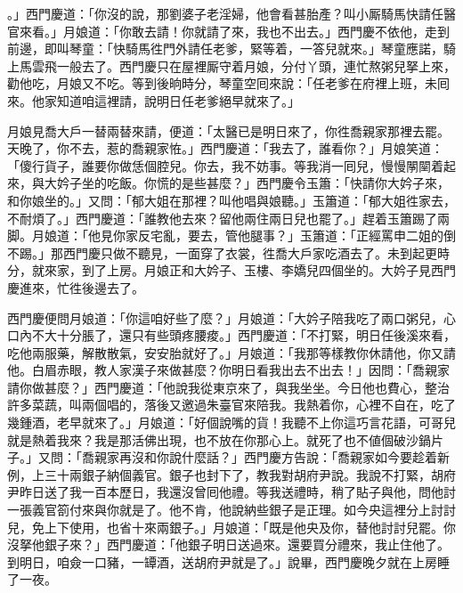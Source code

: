 。」西門慶道：「你沒的說，那劉婆子老淫婦，他會看甚胎產？叫小厮騎馬快請任醫官來看。」月娘道：「你敢去請！你就請了來，我也不出去。」西門慶不依他，走到前邊，即叫琴童：「快騎馬徃門外請任老爹，緊等着，一答兒就來。」琴童應諾，騎上馬雲飛一般去了。西門慶只在屋裡厮守着月娘，分付丫頭，連忙熬粥兒拏上來，勸他吃，月娘又不吃。等到後晌時分，琴童空囘來說：「任老爹在府裡上班，未囘來。他家知道咱這裡請，說明日任老爹絕早就來了。」

月娘見喬大戶一替兩替來請，便道：「太醫已是明日來了，你徃喬親家那裡去罷。天晚了，你不去，惹的喬親家恠。」西門慶道：「我去了，誰看你？」月娘笑道：「傻行貨子，誰要你做恁個腔兒。你去，我不妨事。等我消一囘兒，慢慢䦛䦟着起來，與大妗子坐的吃飯。你慌的是些甚麼？」西門慶令玉簫：「快請你大妗子來，和你娘坐的。」又問：「郁大姐在那裡？叫他唱與娘聽。」玉簫道：「郁大姐徃家去，不耐煩了。」西門慶道：「誰教他去來？留他兩住兩日兒也罷了。」趕着玉簫踢了兩脚。月娘道：「他見你家反宅亂，要去，管他腿事？」玉簫道：「正經罵申二姐的倒不踢。」{}那西門慶只做不聽見，一面穿了衣裳，徃喬大戶家吃酒去了。未到起更時分，就來家，到了上房。月娘正和大妗子、玉樓、李嬌兒四個坐的。大妗子見西門慶進來，忙徃後邊去了。

西門慶便問月娘道：「你這咱好些了麼？」月娘道：「大妗子陪我吃了兩口粥兒，心口內不大十分脹了，還只有些頭疼腰痠。」西門慶道：「不打緊，明日任後溪來看，吃他兩服藥，解散散氣，安安胎就好了。」月娘道：「我那等樣教你休請他，你又請他。白眉赤眼，教人家漢子來做甚麼？你明日看我出去不出去！」因問：「喬親家請你做甚麼？」西門慶道：「他說我從東京來了，與我坐坐。今日他也費心，整治許多菜蔬，叫兩個唱的，落後又邀過朱臺官來陪我。我熱着你，心裡不自在，吃了幾鍾酒，老早就來了。」月娘道：「好個說嘴的貨！我聽不上你這巧言花語，可哥兒就是熱着我來？我是那活佛出現，也不放在你那心上。就死了也不値個破沙鍋片子。」又問：「喬親家再沒和你說什麼話？」西門慶方告說：「喬親家如今要趁着新例，上三十兩銀子納個義官。銀子也封下了，教我對胡府尹說。我說不打緊，胡府尹昨日送了我一百本歷日，我還沒曾囘他禮。等我送禮時，稍了貼子與他，問他討一張義官箚付來與你就是了。他不肯，他說納些銀子是正理。如今央這裡分上討討兒，免上下使用，也省十來兩銀子。」月娘道：「既是他央及你，替他討討兒罷。你沒拏他銀子來？」西門慶道：「他銀子明日送過來。還要買分禮來，我止住他了。到明日，咱僉一口豬，一罈酒，送胡府尹就是了。」說畢，西門慶晚夕就在上房睡了一夜。

